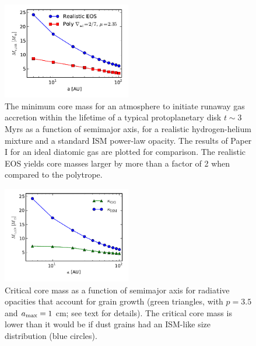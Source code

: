 \documentclass[apj]{emulateapj}
\begin{document}
\begin{figure}[h!]
\centering
\includegraphics[width=0.5\textwidth]{../../figs/ModelAtmospheres/RadSelfGravRealEOS/PaperFigs/Mc_vs_a_poly_real_paper.pdf}
\caption{The minimum core mass for an atmosphere to initiate runaway gas accretion within the lifetime of a typical protoplanetary disk $t \sim 3$ Myrs as a function of semimajor axis, for a realistic hydrogen-helium mixture and a standard ISM power-law opacity. The results of Paper I for an ideal diatomic gas are plotted for comparison. The realistic EOS yields core masses larger by more than a factor of 2 when compared to the polytrope.}
\label{fig:Mvsaplot}
\end{figure}


\begin{figure}[h!]
\centering
\includegraphics[width=0.5\textwidth]{../../figs/ModelAtmospheres/RadSelfGravRealEOS/PaperFigs/Mcrit_vs_a_gg.pdf}
\caption{Critical core mass as a function of semimajor axis for radiative opacities that account for grain growth (green triangles, with $p=3.5$ and $a_{\rm max}=1$ cm; see text for details). The critical core mass is lower than it would be if dust grains had an ISM-like size distribution (blue circles).}
\label{fig:Mcritvsagg}
\end{figure}
\end{document}
